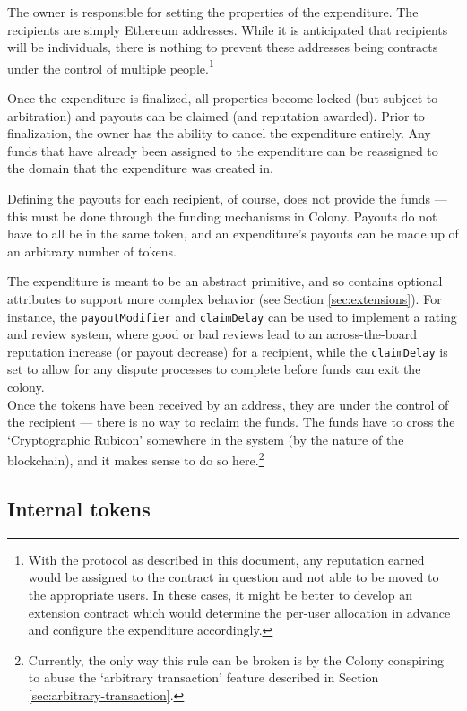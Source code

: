 The owner is responsible for setting the properties of the expenditure. The recipients are simply Ethereum addresses. While it is anticipated that recipients will be individuals, there is nothing to prevent these addresses being contracts under the control of multiple people.\footnote{With the protocol as described in this document, any reputation earned would be assigned to the contract in question and not able to be moved to the appropriate users. In these cases, it might be better to develop an extension contract which would determine the per-user allocation in advance and configure the expenditure accordingly.}

Once the expenditure is finalized, all properties become locked (but subject to arbitration) and payouts can be claimed (and reputation awarded). Prior to finalization, the owner has the ability to cancel the expenditure entirely. Any funds that have already been assigned to the expenditure can be reassigned to the domain that the expenditure was created in.

Defining the payouts for each recipient, of course, does not provide the funds --- this must be done through the funding mechanisms in Colony. Payouts do not have to all be in the same token, and an expenditure's payouts can be made up of an arbitrary number of tokens.

The expenditure is meant to be an abstract primitive, and so contains optional attributes to support more complex behavior (see Section \ref{sec:extensions}). For instance, the \texttt{payoutModifier} and \texttt{claimDelay} can be used to implement a rating and review system, where good or bad reviews lead to an across-the-board reputation increase (or payout decrease) for a recipient, while the \texttt{claimDelay} is set to allow for any dispute processes to complete before funds can exit the colony. \\

Once the tokens have been received by an address, they are under the control of the recipient --- there is no way to reclaim the funds. The funds have to cross the `Cryptographic Rubicon' somewhere in the system (by the nature of the blockchain), and it makes sense to do so here.\footnote{Currently, the only way this rule can be broken is by the Colony conspiring to abuse the `arbitrary transaction' feature described in Section \ref{sec:arbitrary-transaction}.}

\subsection{Internal tokens}\label{sec:colony-tokens}

